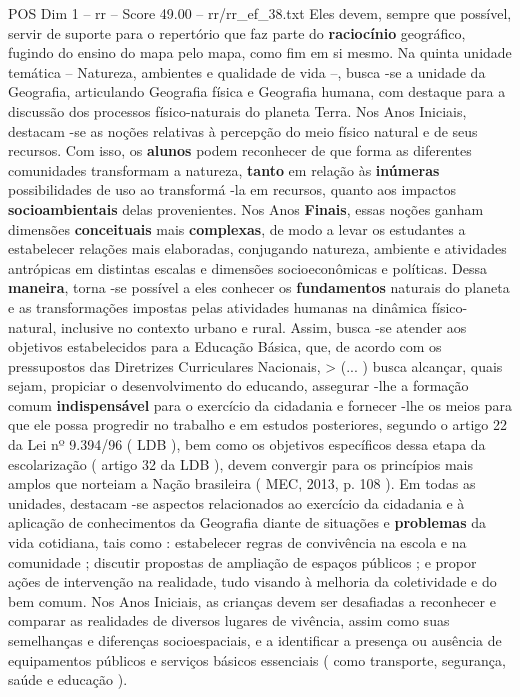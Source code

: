 \begin{textsample}{POS Dim 1 – rr – Score 49.00 – rr/rr\_ef\_38.txt}
Eles devem, sempre que possível, servir de suporte para o repertório que faz parte do \textbf{raciocínio} geográfico, fugindo do ensino do mapa pelo mapa, como fim em si mesmo.
Na quinta unidade temática – Natureza, ambientes e qualidade de vida –, busca -se a unidade da Geografia, articulando Geografia física e Geografia humana, com destaque para a discussão dos processos físico-naturais do planeta Terra.
Nos Anos Iniciais, destacam -se as noções relativas à percepção do meio físico natural e de seus recursos.
Com isso, os \textbf{alunos} podem reconhecer de que forma as diferentes comunidades transformam a natureza, \textbf{tanto} em relação às \textbf{inúmeras} possibilidades de uso ao transformá -la em recursos, quanto aos impactos \textbf{socioambientais} delas provenientes.
Nos Anos \textbf{Finais}, essas noções ganham dimensões \textbf{conceituais} mais \textbf{complexas}, de modo a levar os estudantes a estabelecer relações mais elaboradas, conjugando natureza, ambiente e atividades antrópicas em distintas escalas e dimensões socioeconômicas e políticas.
Dessa \textbf{maneira}, torna -se possível a eles conhecer os \textbf{fundamentos} naturais do planeta e as transformações impostas pelas atividades humanas na dinâmica físico-natural, inclusive no contexto urbano e rural.
Assim, busca -se atender aos objetivos estabelecidos para a Educação Básica, que, de acordo com os pressupostos das Diretrizes Curriculares Nacionais, > (... ) busca alcançar, quais sejam, propiciar o desenvolvimento do educando, assegurar -lhe a formação comum \textbf{indispensável} para o exercício da cidadania e fornecer -lhe os meios para que ele possa progredir no trabalho e em estudos posteriores, segundo o artigo 22 da Lei nº 9.394/96 ( LDB ), bem como os objetivos específicos dessa etapa da escolarização ( artigo 32 da LDB ), devem convergir para os princípios mais amplos que norteiam a Nação brasileira ( MEC, 2013, p. 108 ).
Em todas as unidades, destacam -se aspectos relacionados ao exercício da cidadania e à aplicação de conhecimentos da Geografia diante de situações e \textbf{problemas} da vida cotidiana, tais como : estabelecer regras de convivência na escola e na comunidade ; discutir propostas de ampliação de espaços públicos ; e propor ações de intervenção na realidade, tudo visando à melhoria da coletividade e do bem comum.
Nos Anos Iniciais, as crianças devem ser desafiadas a reconhecer e comparar as realidades de diversos lugares de vivência, assim como suas semelhanças e diferenças socioespaciais, e a identificar a presença ou ausência de equipamentos públicos e serviços básicos essenciais ( como transporte, segurança, saúde e educação ).

\end{textsample}
